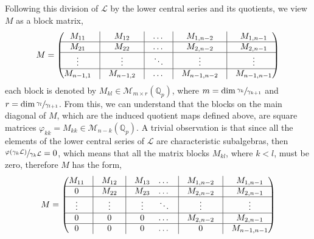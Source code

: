 \documentclass[12pt]{article}
\begin{document}
Following this division of $\mathcal{L}$ by the lower central series and its quotients, we view $M$ as a block matrix, \[M=\begin{pmatrix}
M_{11} & \vline & M_{12}&\vline & \dots& \vline & M_{1,n-2} & \vline&M_{1,n-1}\\
\hline
M_{21} & \vline & M_{22}&\vline & \dots &\vline & M_{2,n-2} &\vline& M_{2,n-1}\\
\hline
\vdots & \vline & \vdots&\vline & \ddots &\vline & \vdots &\vline& \vdots\\
\hline
M_{n-1,1} & \vline & M_{n-1,2}&\vline & \dots &\vline & M_{n-1,n-2} &\vline& M_{n-1,n-1}\\
\end{pmatrix}\]
each block is denoted by $M_{kl}\in\mathcal{M}_{m\times{r}}(\mathbb{Q}_p)$, where $m=\dim\sfrac{\gamma_k}{\gamma_{k+1}}$ and $r=\dim\sfrac{\gamma_l}{\gamma_{l+1}}$. From this, we can understand that the blocks on the main diagonal of $M$, which are the induced quotient maps defined above, are square matrices $\varphi_{kk}=M_{kk}\in\mathcal{M}_{n-k}(\mathbb{Q}_p)$. A trivial observation is that since all the elements of the lower central series of $\mathcal{L}$ are characteristic subalgebras, then $\sfrac{\varphi(\gamma_k\mathcal{L})}{\gamma_k\mathcal{L}}=0$, which means that all the matrix blocks $M_{kl}$, where $k<l$, must be zero, therefore $M$ has the form, \[M=\begin{pmatrix}
M_{11} & \vline & M_{12}&\vline & M_{13} & \dots& \vline & M_{1,n-2} & \vline&M_{1,n-1}\\
\hline
0 & \vline & M_{22}&\vline & M_{23} & \dots &\vline & M_{2,n-2} &\vline& M_{2,n-1}\\
\hline
\vdots & \vline & \vdots&\vline & \vdots & \ddots &\vline & \vdots &\vline& \vdots\\
\hline
0 & \vline & 0&\vline & 0 & \dots &\vline & M_{2,n-2} &\vline& M_{2,n-1}\\
\hline
0 & \vline & 0 &\vline & 0 & \dots &\vline & 0 &\vline& M_{n-1,n-1}\\
\end{pmatrix}
\]
\end{document}
